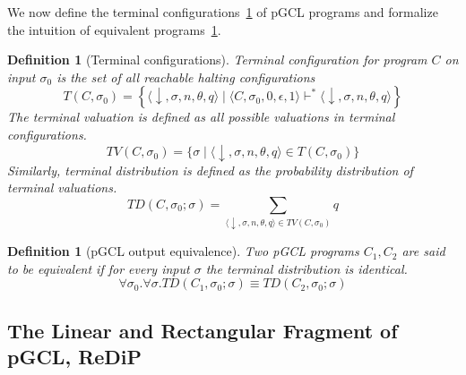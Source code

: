 \documentclass[a4paper]{article}
\newtheorem{definition}[theorem]{Definition}
\begin{document}
We now define the terminal configurations~\ref{def:pgcl-term} of pGCL programs and formalize the intuition of equivalent programs~\ref{def:pgcl-equiv}.

\begin{definition}[Terminal configurations]\label{def:pgcl-term}
	Terminal configuration for program \(C\) on input \(\sigma_0\) is the set of all reachable halting configurations
	\[
		T(C,\sigma_0) = \left\{
		\langle \downarrow,\sigma,n,\theta,q \rangle
		\mid
		\langle C,\sigma_0,0,\epsilon,1 \rangle
		\vdash^\ast
		\langle \downarrow,\sigma,n,\theta,q \rangle
		\right\}
	\]
	The terminal valuation is defined as all possible valuations in terminal configurations.
	\[
		TV(C,\sigma_0) =
		\{\sigma \mid
		\langle \downarrow,\sigma,n,\theta,q \rangle \in T(C,\sigma_0)
		\}
	\]
	Similarly, terminal distribution is defined as the probability distribution of terminal valuations.
	\[
		TD(C,\sigma_0;\sigma) = \sum_{\langle \downarrow,\sigma, n,\theta, q \rangle \in TV(C,\sigma_0)} q
	\]
\end{definition}
\begin{definition}[pGCL output equivalence]\label{def:pgcl-equiv}
	Two pGCL programs \(C_1,C_2\) are said to be equivalent if for every input \(\sigma\) the terminal distribution is identical.
	\[
		\forall \sigma_0 . \forall \sigma . TD(C_1,\sigma_0; \sigma)\equiv TD(C_2,\sigma_0;\sigma)
	\]
\end{definition}

\subsection{The Linear and Rectangular Fragment of pGCL, ReDiP}
\end{document}
